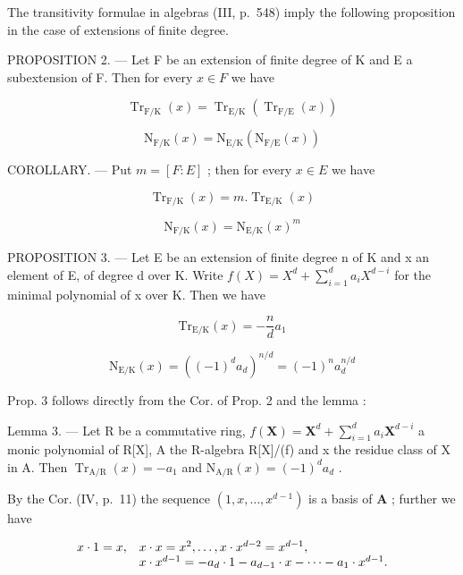 The transitivity formulae in algebras (III, p.~548) imply the following proposition in the case of extensions of finite degree.

PROPOSITION 2. --- Let F be an extension of finite degree of K and E a subextension of F. Then for every \(x \in F\) we have

\[
\operatorname{Tr} _ {\mathrm{F} / \mathrm{K}} (x) = \operatorname{Tr} _ {\mathrm{E} / \mathrm{K}} (\operatorname{Tr} _ {\mathrm{F} / \mathrm{E}} (x))\tag{6}
\]

\[
\mathrm{N} _ {\mathrm{F} / \mathrm{K}} (x) = \mathrm{N} _ {\mathrm{E} / \mathrm{K}} (\mathrm{N} _ {\mathrm{F} / \mathrm{E}} (x))\tag{7}
\]

COROLLARY. --- Put \(m = [F : E]\) ; then for every \(x \in E\) we have

\[
\operatorname{Tr} _ {\mathrm{F} / \mathrm{K}} (x) = m. \operatorname{Tr} _ {\mathrm{E} / \mathrm{K}} (x)\tag{8}
\]

\[
\mathrm{N} _ {\mathrm{F} / \mathrm{K}} (x) = \mathrm{N} _ {\mathrm{E} / \mathrm{K}} (x) ^ {m}\tag{9}
\]

PROPOSITION 3. --- Let E be an extension of finite degree n of K and x an element of E, of degree d over K. Write \(f(X) = X^d + \sum_{i=1}^{d} a_i X^{d-i}\) for the minimal polynomial of x over K. Then we have

\[
\mathrm{Tr} _ {\mathrm{E/K}} (x) = - \frac {n}{d} a _ {1}\tag{10}
\]

\[
\mathrm{N} _ {\mathrm{E} / \mathrm{K}} (x) = ((- 1) ^ {d} a _ {d}) ^ {n / d} = (- 1) ^ {n} a _ {d} ^ {n / d}\tag{11}
\]

Prop. 3 follows directly from the Cor. of Prop. 2 and the lemma :

Lemma 3. --- Let R be a commutative ring, \(f(\mathbf{X}) = \mathbf{X}^d + \sum_{i=1}^{d} a_i \mathbf{X}^{d-i}\) a monic polynomial of R{[}X{]}, A the R-algebra R{[}X{]}/(f) and x the residue class of X in A. Then \(\operatorname{Tr}_{\mathrm{A/R}}(x) = -a_1\) and \(\mathrm{N}_{\mathrm{A/R}}(x) = (-1)^d a_d\) .

By the Cor. (IV, p.~11) the sequence \((1, x, \ldots, x^{d-1})\) is a basis of \(\mathbf{A}\) ; further we have

\[
\begin{array}{r l} x \cdot 1 = x, & x \cdot x = x ^ {2}, \dots , x \cdot x ^ {d - 2} = x ^ {d - 1}, \\ & x \cdot x ^ {d - 1} = - a _ {d} \cdot 1 - a _ {d - 1} \cdot x - \dots - a _ {1} \cdot x ^ {d - 1}. \end{array}
\]

